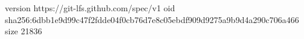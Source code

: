 version https://git-lfs.github.com/spec/v1
oid sha256:6dbb1e9d99c47f2fdde04f0cb76d7e8c05ebdf909d9275a9b9d4a290c706a466
size 21836
